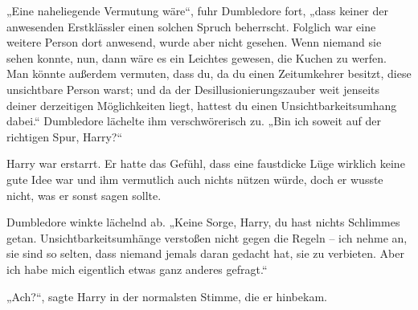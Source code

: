 „Eine naheliegende Vermutung wäre“, fuhr Dumbledore fort, „dass keiner der anwesenden Erstklässler einen solchen Spruch beherrscht. Folglich war eine weitere Person dort anwesend, wurde aber nicht gesehen. Wenn niemand sie sehen konnte, nun, dann wäre es ein Leichtes gewesen, die Kuchen zu werfen. Man könnte außerdem vermuten, dass du, da du einen Zeitumkehrer besitzt, diese unsichtbare Person warst; und da der Desillusionierungszauber weit jenseits deiner derzeitigen Möglichkeiten liegt, hattest du einen Unsichtbarkeitsumhang dabei.“ Dumbledore lächelte ihm verschwörerisch zu. „Bin ich soweit auf der richtigen Spur, Harry?“

Harry war erstarrt. Er hatte das Gefühl, dass eine faustdicke Lüge wirklich keine gute Idee war und ihm vermutlich auch nichts nützen würde, doch er wusste nicht, was er sonst sagen sollte.

Dumbledore winkte lächelnd ab. „Keine Sorge, Harry, du hast nichts Schlimmes getan. Unsichtbarkeitsumhänge verstoßen nicht gegen die Regeln – ich nehme an, sie sind so selten, dass niemand jemals daran gedacht hat, sie zu verbieten. Aber ich habe mich eigentlich etwas ganz anderes gefragt.“

„Ach?“, sagte Harry in der normalsten Stimme, die er hinbekam.

